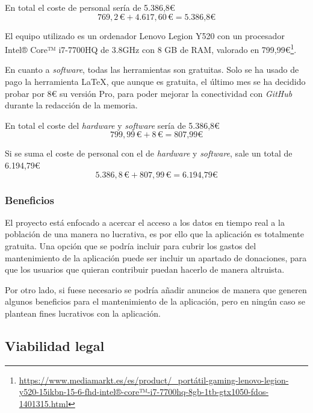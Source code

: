 En total el coste de personal sería de 5.386,8€
$$769,2 \, \text{€} + 4.617,60 \, \text{€} = \text{5.386,8€}$$

El equipo utilizado es un ordenador Lenovo Legion Y520 con un procesador Intel® Core™ i7-7700HQ de 3.8GHz con 8 GB de RAM, valorado en 799,99€\footnote{\url{https://www.mediamarkt.es/es/product/_portátil-gaming-lenovo-legion-y520-15ikbn-15-6-fhd-intel®-core™-i7-7700hq-8gb-1tb-gtx1050-fdos-1401315.html}}.

En cuanto a \textit{software}, todas las herramientas son gratuitas. Solo se ha usado de pago la herramienta \LaTeX{}, que aunque es gratuita, el último mes se ha decidido probar por 8€ su versión Pro, para poder mejorar la conectividad con \textit{GitHub} durante la redacción de la memoria.

En total el coste del \textit{hardware} y \textit{software} sería de 5.386,8€
$$799,99 \, \text{€} + 8 \, \text{€} = \text{807,99€}$$

Si se suma el coste de personal con el de \textit{hardware} y \textit{software}, sale un total de 6.194,79€
$$5.386,8 \, \text{€} + 807,99 \, \text{€} = \text{6.194,79€}$$

\subsubsection{Beneficios}

El proyecto está enfocado a acercar el acceso a los datos en tiempo real a la población de una manera no lucrativa, es por ello que la aplicación es totalmente gratuita.
Una opción que se podría incluir para cubrir los gastos del mantenimiento de la aplicación puede ser incluir un apartado de donaciones, para que los usuarios que quieran contribuir puedan hacerlo de manera altruista.

Por otro lado, si fuese necesario se podría añadir anuncios de manera que generen algunos beneficios para el mantenimiento de la aplicación, pero en ningún caso se plantean fines lucrativos con la aplicación.

\subsection{Viabilidad legal}


